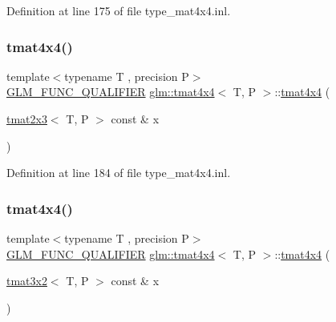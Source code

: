 Definition at line 175 of file type\+\_\+mat4x4.\+inl.

\mbox{\label{structglm_1_1tmat4x4_a966a90852a10e3214df58a8823260cb1}} 
\subsubsection{\texorpdfstring{tmat4x4()}{tmat4x4()}\hspace{0.1cm}{\footnotesize\ttfamily [13/22]}}
{\footnotesize\ttfamily template$<$typename T , precision P$>$ \\
\mbox{\hyperlink{setup_8hpp_a33fdea6f91c5f834105f7415e2a64407}{G\+L\+M\+\_\+\+F\+U\+N\+C\+\_\+\+Q\+U\+A\+L\+I\+F\+I\+ER}} \mbox{\hyperlink{structglm_1_1tmat4x4}{glm\+::tmat4x4}}$<$ T, P $>$\+::\mbox{\hyperlink{structglm_1_1tmat4x4}{tmat4x4}} (\begin{DoxyParamCaption}\item[{\mbox{\hyperlink{structglm_1_1tmat2x3}{tmat2x3}}$<$ T, P $>$ const \&}]{x }\end{DoxyParamCaption})}



Definition at line 184 of file type\+\_\+mat4x4.\+inl.

\mbox{\label{structglm_1_1tmat4x4_aebc9c223de2814546e636fa023185bcb}} 
\subsubsection{\texorpdfstring{tmat4x4()}{tmat4x4()}\hspace{0.1cm}{\footnotesize\ttfamily [14/22]}}
{\footnotesize\ttfamily template$<$typename T , precision P$>$ \\
\mbox{\hyperlink{setup_8hpp_a33fdea6f91c5f834105f7415e2a64407}{G\+L\+M\+\_\+\+F\+U\+N\+C\+\_\+\+Q\+U\+A\+L\+I\+F\+I\+ER}} \mbox{\hyperlink{structglm_1_1tmat4x4}{glm\+::tmat4x4}}$<$ T, P $>$\+::\mbox{\hyperlink{structglm_1_1tmat4x4}{tmat4x4}} (\begin{DoxyParamCaption}\item[{\mbox{\hyperlink{structglm_1_1tmat3x2}{tmat3x2}}$<$ T, P $>$ const \&}]{x }\end{DoxyParamCaption})}



